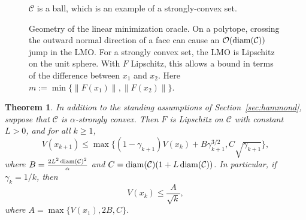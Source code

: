 \documentclass[pdflatex,sn-mathphys-num]{sn-jnl}%
\newcommand\diam{\mathop{\rm diam}}
\renewcommand\O{\mathcal{O}}
\newcommand\C{\mathcal{C}}
\theoremstyle{thmstyleone}%
\newtheorem{theorem}{Theorem}%
\theoremstyle{thmstyletwo}%
\theoremstyle{thmstylethree}%
\begin{document}
\begin{figure}[h]
\begin{minipage}[t]{0.48\textwidth}

\vspace{0.8ex}
\small $\C$ is a ball, which is an example of a strongly-convex set.
\end{minipage}
\caption{Geometry of the linear minimization oracle. On a polytope, crossing the outward normal direction of
a face can cause an $\mathcal{O}(\diam(\C))$ jump in the LMO. For a strongly convex set, the LMO is Lipschitz
on the unit sphere. With $F$ Lipschitz, this allows a bound in terms of the difference between $x_1$ and $x_2$.
Here $m := \min\{\|F(x_1)\|, \|F(x_2)\|\}$.}
\label{fig:lmo-geometry-revised}
\end{figure}

\begin{theorem}\label{thm:mono-rate}
  In addition to the standing assumptions of Section~\ref{sec:hammond}, suppose that $\C$ is $\alpha$-strongly convex.
  Then $F$ is Lipschitz on $\C$ with constant $L > 0$, and for all $k \geq 1$,
  \[
    V(x_{k+1}) \leq \max\big\{(1-\gamma_{k+1})V(x_k) + B\gamma_{k+1}^{3/2}, C\sqrt{\gamma_{k+1}}\big\},
  \]
  where $B = \frac{2L^2\diam(\C)^2}{\alpha}$ and $C = \diam(\C)(1 + L\diam(\C))$. In particular, if $\gamma_k = 1/k$, then
  \[
    V(x_k) \leq \frac{A}{\sqrt{k}},
  \]
  where $A = \max\{V(x_1), 2B, C\}$.
\end{theorem}
\end{document}
